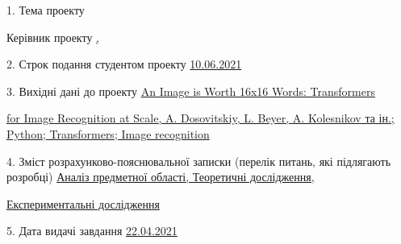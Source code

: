 \documentclass[a4paper,14pt]{extreport}
\begin{document}
{        1. Тема проекту \uline{\hfill\Topic\hfill}

        Керівник проекту \uline{\hfill\ScientificDirectorNameFull, \ScientificDirectorPositionSmall\hfill}

        2. Строк подання студентом проекту \uline{\hfill10.06.2021\hfill}
        
        3. Вихідні дані до проекту \uline{An Image is Worth 16x16 Words: Transformers\hfill}

        \uline{for Image Recognition at Scale, A. Dosovitskiy, L. Beyer, A. Kolesnikov та ін.; Python; Transformers; Image recognition\hfill}

        \uline{\hfill}

        \uline{\hfill}

        4. Зміст розрахунково-пояснювальної записки (перелік питань, які підлягають розробці)
        \uline{Аналіз предметної області, Теоретичні дослідження,\hfill}

        \uline{Експериментальні дослідження\hfill}

        \uline{\hfill}
        
        \uline{\hfill}

        5. Дата видачі завдання \uline{\hfill 22.04.2021 \hfill}
}
\end{document}
